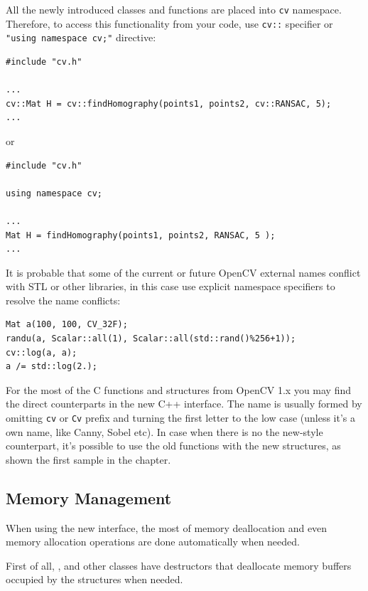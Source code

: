 All the newly introduced classes and functions are placed into \texttt{cv} namespace. Therefore, to access this functionality from your code, use \texttt{cv::} specifier or \texttt{"using namespace cv;"} directive:
\begin{lstlisting}
#include "cv.h"

...
cv::Mat H = cv::findHomography(points1, points2, cv::RANSAC, 5);
...
\end{lstlisting}
or
\begin{lstlisting}
#include "cv.h"

using namespace cv;

...
Mat H = findHomography(points1, points2, RANSAC, 5 );
...
\end{lstlisting}

It is probable that some of the current or future OpenCV external names conflict with STL
or other libraries, in this case use explicit namespace specifiers to resolve the name conflicts:
\begin{lstlisting}
Mat a(100, 100, CV_32F);
randu(a, Scalar::all(1), Scalar::all(std::rand()%256+1));
cv::log(a, a);
a /= std::log(2.);
\end{lstlisting}

For the most of the C functions and structures from OpenCV 1.x you may find the direct counterparts in the new C++ interface. The name is usually formed by omitting \texttt{cv} or \texttt{Cv} prefix and turning the first letter to the low case (unless it's a own name, like Canny, Sobel etc). In case when there is no the new-style counterpart, it's possible to use the old functions with the new structures, as shown the first sample in the chapter.

\subsection{Memory Management}

When using the new interface, the most of memory deallocation and even memory allocation operations are done automatically when needed.

First of all, ,  and other classes have destructors
that deallocate memory buffers occupied by the structures when needed.

